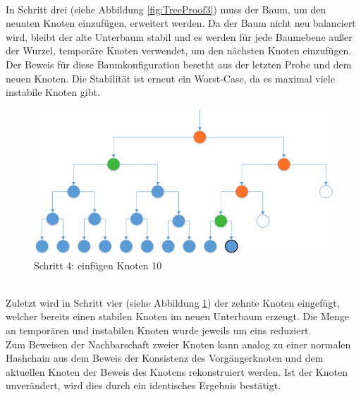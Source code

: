 \\
In Schritt drei (siehe Abbildung \ref{fig:TreeProof3}) muss der Baum, um den neunten Knoten einzufügen, erweitert werden. Da der Baum nicht neu balanciert wird, bleibt der alte Unterbaum stabil und es werden für jede Baumebene außer der Wurzel, temporäre Knoten verwendet, um den nächsten Knoten einzufügen. Der Beweis für diese Baumkonfiguration besetht aus der letzten Probe und dem neuen Knoten. Die Stabilität ist erneut ein Worst-Case, da es maximal viele instabile Knoten gibt.\\
\begin{figure}[!htb]
	\includegraphics[width=1\textwidth]{content/pictures/TreeProof4}
	\caption{Schritt 4: einfügen Knoten 10}
	\label{fig:TreeProof4}
\end{figure}
\\
Zuletzt wird in Schritt vier (siehe Abbildung \ref{fig:TreeProof4}) der zehnte Knoten eingefügt, welcher bereits einen stabilen Knoten im neuen Unterbaum erzeugt. Die Menge an temporären und instabilen Knoten wurde jeweils um eins reduziert.\\

Zum Beweisen der Nachbarschaft zweier Knoten kann analog zu einer normalen Hashchain aus dem Beweis der Konsistenz des Vorgängerknoten und dem aktuellen Knoten der Beweis des Knotens rekonstruiert werden. Ist der Knoten unverändert, wird dies durch ein identisches Ergebnis bestätigt.\\

